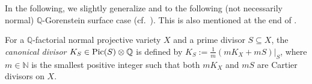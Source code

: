 


In the following, we slightly generalize \cite[Theorem 2.3]{Ser95} and \cite[Corollary 1.8]{HL20}  %
to the following (not necessarily normal)  $\mathbb{Q}$-Gorenstein surface case (cf.~\cite[Conjecture 1.3]{CCP08}). 
This is also mentioned at the end of \cite[Section 2]{Ser95}.

For a $\mathbb{Q}$-factorial normal projective variety $X$ and a prime divisor $S\subseteq X$,  the \textit{canonical divisor} $K_S\in\textup{Pic}(S)\otimes\mathbb{Q}$ is defined by  
$K_S:=\frac{1}{m}(mK_X+mS)|_S$, where $m\in\mathbb{N}$ is the smallest positive integer such that both $mK_X$ and $mS$ are Cartier divisors on $X$. 







